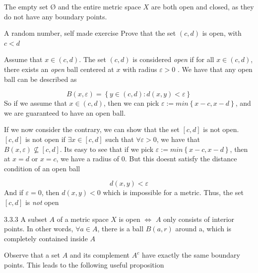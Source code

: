 \documentclass[a4paper,norsk]{article}
\renewcommand{\epsilon}{\varepsilon}
\begin{document}
The empty set $ Ø $ and the entire metric space $ X $ are both open and closed, as they do not have any boundary points.



\begin{oppgavebox}{A random number, self made exercise}{}
Prove that the set $ \left( c, d \right)  $ is open, with $ c < d $ 
\begin{proofbox}{}{}
  Assume that $ x \in \left( c, d \right)  $. The set $ \left( c, d \right)  $ is considered \textit{open} if for all $ x \in  \left( c, d \right)  $, there exists  an \textit{open} ball centered at $ x $  with radius $ \epsilon > 0 $ . We have that any open ball can be described as

  \[
      B \left( x, \epsilon   \right) = \left\{ y \in \left( c, d \right) : d(x, y) < \epsilon   \right\} 
  \]
  So if we assume that $ x \in \left( c, d \right)  $, then we can pick $ \epsilon  := min \left\{ x-c, x-d \right\}  $, and we are guaranteed to have an open ball.


  If we now consider the contrary, we can show that the set $ \left[ c, d \right]  $ is not open. $ \left[ c, d \right]  $ is not open if $ \exists  x \in \left[ c, d \right] $ such that $ \forall \epsilon > 0 $, we have that $ B(x, \epsilon ) \not \subseteq \left[ c, d \right]  $. Its easy to see that if we pick $ \epsilon := min \left\{ x-c, x-d \right\}  $, then at $ x = d $ or $ x = c $, we have a radius of 0. But this doesnt satisfy the distance condition of an open ball
  
  \[
      d(x, y) < \epsilon 
  \]
  And if $ \epsilon =0 $, then $ d(x, y) < 0 $  which is impossible for a metric. Thus, the set $ \left[ c, d \right]  $ is \textit{not} open
  
  
\end{proofbox}
\end{oppgavebox}



\begin{propositionbox}{3.3.3}{}
A subset $ A $ of a metric space $ X $ is open $ \iff $ $ A $ only consists of interior points. In other words, $ \forall a \in A $, there is a ball $ B \left( a, r \right)  $ around a, which is completely contained inside $ A $ 
\end{propositionbox}

Observe that a set $ A $ and its complement $ A^c $ have exactly the same boundary points. This leads to the following useful proposition
\end{document}
